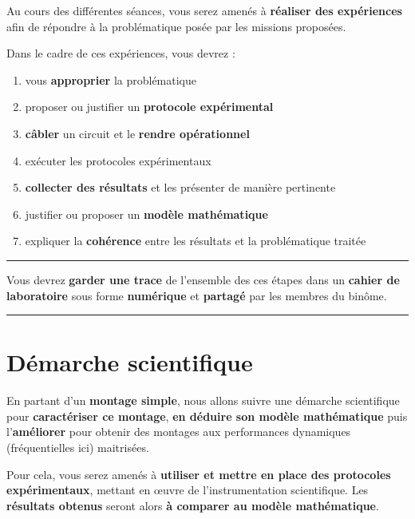 \documentclass[a4paper,11pt,twoside]{book} %
\begin{document}
{Au cours des différentes séances, vous serez amenés à \textbf{réaliser des expériences} afin de répondre à la problématique posée par les missions proposées. 

\medskip

Dans le cadre de ces expériences, vous devrez :

\begin{enumerate}
	\item vous \textbf{approprier} la problématique
	\item proposer ou justifier un \textbf{protocole expérimental}
	\item \textbf{câbler} un circuit et le \textbf{rendre opérationnel}
	\item exécuter les protocoles expérimentaux
	\item \textbf{collecter des résultats} et les présenter de manière pertinente
	\item justifier ou proposer un \textbf{modèle mathématique}
	\item expliquer la \textbf{cohérence} entre les résultats et la problématique traitée

\end{enumerate}

\bigskip


\noindent \rule{\linewidth}{1pt}

{\large
Vous devrez \textbf{garder une trace} de l'ensemble des ces étapes dans un \textbf{cahier de laboratoire} sous forme \textbf{numérique} et \textbf{partagé} par les membres du binôme.
}

\noindent \rule{\linewidth}{1pt}

\section{Démarche scientifique}

En partant d'un \textbf{montage simple}, nous allons suivre une démarche scientifique pour \textbf{caractériser ce montage}, \textbf{en déduire son modèle mathématique} puis l'\textbf{améliorer} pour obtenir des montages aux performances dynamiques (fréquentielles ici) maitrisées.

\medskip

Pour cela, vous serez amenés à \textbf{utiliser et mettre en place des protocoles expérimentaux}, mettant en \oe{}uvre de l'instrumentation scientifique. Les \textbf{résultats obtenus} seront alors \textbf{à comparer au modèle mathématique}.

\medskip

}
\end{document}
